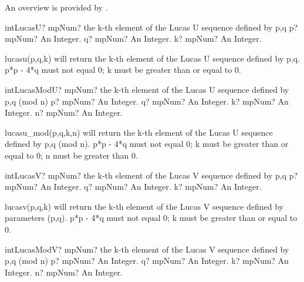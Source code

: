 An overview is provided by \cite{Joye_1996}.

\vspace{0.6cm}
\begin{mpFunctionsExtract}
	\mpFunctionThree
	{intLucasU? mpNum? the k-th element of the Lucas U sequence defined by p,q}
	{p? mpNum? An Integer.}
	{q? mpNum? An Integer.}
	{k? mpNum? An Integer.}
\end{mpFunctionsExtract}

\vspace{0.3cm}

lucasu(p,q,k) will return the k-th element of the Lucas U sequence defined by p,q. p*p - 4*q
must not equal 0; k must be greater than or equal to 0.




\vspace{0.6cm}
\begin{mpFunctionsExtract}
	\mpFunctionFour
	{intLucasModU? mpNum? the k-th element of the Lucas U sequence defined by p,q (mod n)}
	{p? mpNum? An Integer.}
	{q? mpNum? An Integer.}
	{k? mpNum? An Integer.}
	{n? mpNum? An Integer.}
\end{mpFunctionsExtract}

\vspace{0.3cm}


lucasu\_mod(p,q,k,n) will return the k-th element of the Lucas U sequence defined by p,q (mod
n). p*p - 4*q must not equal 0; k must be greater than or equal to 0; n must be greater than 0.


\vspace{0.6cm}
\begin{mpFunctionsExtract}
	\mpFunctionThree
	{intLucasV? mpNum? the k-th element of the Lucas V sequence defined by p,q}
	{p? mpNum? An Integer.}
	{q? mpNum? An Integer.}
	{k? mpNum? An Integer.}
\end{mpFunctionsExtract}

\vspace{0.3cm}

lucasv(p,q,k) will return the k-th element of the Lucas V sequence defined by parameters (p,q).
p*p - 4*q must not equal 0; k must be greater than or equal to 0.




\vspace{0.6cm}
\begin{mpFunctionsExtract}
	\mpFunctionFour
	{intLucasModV? mpNum? the k-th element of the Lucas V sequence defined by p,q (mod n)}
	{p? mpNum? An Integer.}
	{q? mpNum? An Integer.}
	{k? mpNum? An Integer.}
	{n? mpNum? An Integer.}
\end{mpFunctionsExtract}

